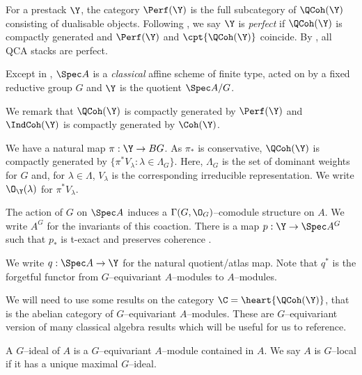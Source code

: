 \documentclass{amsart}
\begin{document}
  \sssec{}

  For a prestack \(\Y\), the category \(\Perf(\Y)\) is the
  full subcategory of \(\QCoh(\Y)\) consisting of
  dualisable objects. Following \cite{ben_zvi_francis_nadler:2010},
  we say \(\Y\) is \emph{perfect} if \(\QCoh(\Y)\) is compactly
  generated and \(\Perf(\Y)\) and \(\cpt{\QCoh(\Y)}\)
  coincide.
  By \cite[Corollary 1.4.3]{drinfeld_gaitsgory:2013},
  all QCA stacks are perfect.

  \sssec{}\label{sec:quotient_notation}

  Except in , \(\Spec A\) is a \emph{classical}
  affine scheme of finite type,
  acted on by a fixed reductive group \(G\) and \(\Y\)
  is the quotient \(\Spec A/G\).

  We remark that \(\QCoh(\Y)\) is compactly
  generated by \(\Perf(\Y)\) and \(\IndCoh(\Y)\)
  is compactly generated by \(\Coh(\Y)\).

  We have a natural map \(\pi: \Y \to BG\). As
  \(\pi_\ast\) is conservative, \(\QCoh(\Y)\)
  is compactly generated by \({\{\pi^\ast V_\lambda : \lambda \in \Lambda_G\}}\).
  Here, \(\Lambda_G\) is the set of dominant weights
  for \(G\) and, for \(\lambda \in \Lambda\), 
  \(V_\lambda\) is the corresponding irreducible
  representation. We write \(\O_\Y(\lambda)\)
  for \(\pi^\ast V_\lambda\).

  The action of \(G\) on \(\Spec A\) induces
  a \(\Gamma(G, \O_G)\)--comodule structure
  on \(A\). We write \(A^G\) for the invariants
  of this coaction. There is a map
  \(p: \Y \to \Spec A^G\) such that
  \(p_\ast\) is t-exact and preserves
  coherence \cite{alper:2013}.

  We write \(q: \Spec A \to \Y\) for the
  natural quotient/atlas map.
  Note that \(q^\ast\) is
  the forgetful functor from \(G\)--equivariant \(A\)--modules
  to \(A\)--modules.


  We will need to use some results on the category
  \(\C = \heart{\QCoh(\Y)}\), that is the abelian
  category of \(G\)--equivariant \(A\)--modules.
  These are \(G\)--equivariant version
  of many classical algebra results which
  will be useful for us to reference.

  \sssec{}

  A \(G\)--ideal of \(A\) is a \(G\)--equivariant \(A\)--module 
  contained in \(A\). We say \(A\) is \(G\)--local if it has
  a unique maximal \(G\)--ideal.

  \sssec{}
\end{document}
